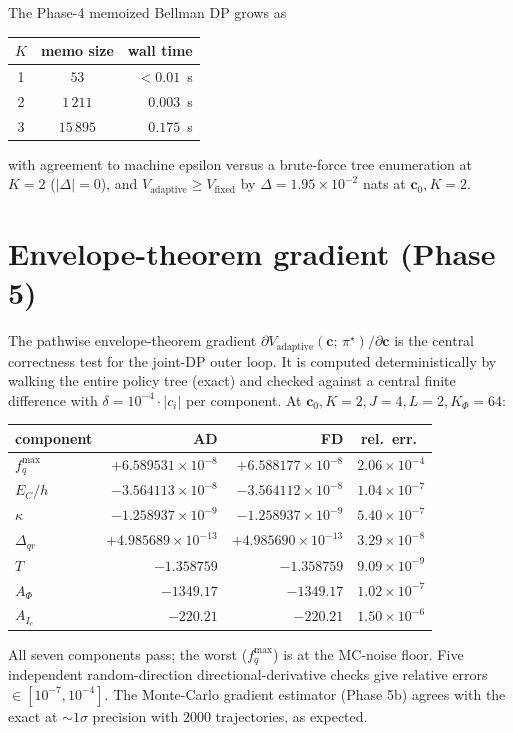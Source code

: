 \documentclass[11pt,a4paper]{article}
\begin{document}
The Phase-4 memoized Bellman DP grows as
\begin{center}
\begin{tabular}{@{}ccr@{}}
\toprule
$K$ & memo size & wall time \\
\midrule
1 & $53$      & $<0.01$~s \\
2 & $1\,211$  & $0.003$~s \\
3 & $15\,895$ & $0.175$~s \\
\bottomrule
\end{tabular}
\end{center}
with agreement to machine epsilon versus a brute-force tree enumeration at $K=2$ ($|\Delta| = 0$), and $V_{\text{adaptive}} \ge V_{\text{fixed}}$ by $\Delta = 1.95\!\times\!10^{-2}$ nats at $\bm c_0, K=2$.

\section{Envelope-theorem gradient (Phase 5)}
\label{sec:phase5}

The pathwise envelope-theorem gradient $\partial V_{\text{adaptive}}(\bm c;\,\pi^\star)/\partial\bm c$ is the central correctness test for the joint-DP outer loop.  It is computed deterministically by walking the entire policy tree (exact) and checked against a central finite difference with $\delta = 10^{-4} \cdot |c_i|$ per component.  At $\bm c_0, K=2, J=4, L=2, K_\Phi=64$:
\begin{center}
\begin{tabular}{@{}lrrr@{}}
\toprule
component & AD & FD & rel.\ err.\ \\
\midrule
$f_q^{\max}$     & $+6.589531\!\times\!10^{-8}$  & $+6.588177\!\times\!10^{-8}$  & $2.06\!\times\!10^{-4}$ \\
$E_C/h$          & $-3.564113\!\times\!10^{-8}$  & $-3.564112\!\times\!10^{-8}$  & $1.04\!\times\!10^{-7}$ \\
$\kappa$         & $-1.258937\!\times\!10^{-9}$  & $-1.258937\!\times\!10^{-9}$  & $5.40\!\times\!10^{-7}$ \\
$\Delta_{qr}$    & $+4.985689\!\times\!10^{-13}$ & $+4.985690\!\times\!10^{-13}$ & $3.29\!\times\!10^{-8}$ \\
$T$              & $-1.358759$                    & $-1.358759$                    & $9.09\!\times\!10^{-9}$ \\
$A_\Phi$         & $-1349.17$                     & $-1349.17$                     & $1.02\!\times\!10^{-7}$ \\
$A_{I_c}$        & $-220.21$                      & $-220.21$                      & $1.50\!\times\!10^{-6}$ \\
\bottomrule
\end{tabular}
\end{center}
All seven components pass; the worst ($f_q^{\max}$) is at the MC-noise floor.  Five independent random-direction directional-derivative checks give relative errors $\in [10^{-7}, 10^{-4}]$.  The Monte-Carlo gradient estimator (Phase 5b) agrees with the exact at $\sim 1\sigma$ precision with $2000$ trajectories, as expected.
\end{document}
